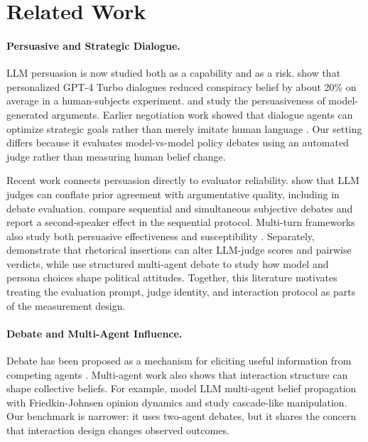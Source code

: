 \documentclass{article}
\begin{document}
\section{Related Work}


\paragraph{Persuasive and Strategic Dialogue.}
LLM persuasion is now studied both as a capability and as a risk. \citet{costello2024conspiracy} show that personalized GPT-4 Turbo dialogues reduced conspiracy belief by about 20\% on average in a human-subjects experiment. \citet{durmus2024persuasiveness} and \citet{singh2024persuasionbench} study the persuasiveness of model-generated arguments. Earlier negotiation work showed that dialogue agents can optimize strategic goals rather than merely imitate human language \citep{lewis2017deal}. Our setting differs because it evaluates model-vs-model policy debates using an automated judge rather than measuring human belief change.

Recent work connects persuasion directly to evaluator reliability. \citet{zahraei2026prior} show that LLM judges can conflate prior agreement with argumentative quality, including in debate evaluation. \citet{carro2025beliefs} compare sequential and simultaneous subjective debates and report a second-speaker effect in the sequential protocol. Multi-turn frameworks also study both persuasive effectiveness and susceptibility \citep{bozdag2025persuade}. Separately, \citet{hwang2025trick} demonstrate that rhetorical insertions can alter LLM-judge scores and pairwise verdicts, while \citet{bandaru2025political} use structured multi-agent debate to study how model and persona choices shape political attitudes. Together, this literature motivates treating the evaluation prompt, judge identity, and interaction protocol as parts of the measurement design.

\paragraph{Debate and Multi-Agent Influence.}
Debate has been proposed as a mechanism for eliciting useful information from competing agents \citep{irving2018debate}. Multi-agent work also shows that interaction structure can shape collective beliefs. For example, \citet{abedini2026stubborn} model LLM multi-agent belief propagation with Friedkin-Johnsen opinion dynamics and study cascade-like manipulation. Our benchmark is narrower: it uses two-agent debates, but it shares the concern that interaction design changes observed outcomes.
\end{document}
